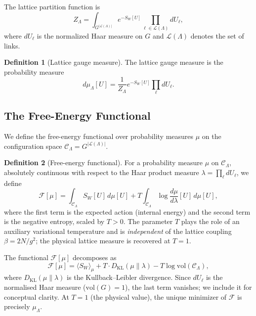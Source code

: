 \documentclass[12pt,a4paper]{article}
\theoremstyle{definition}
\newtheorem{definition}{Definition}[section]
\theoremstyle{plain}
\theoremstyle{remark}
\begin{document}
The lattice partition function is
\begin{equation}
    Z_\Lambda = \int_{G^{|\mathcal{L}(\Lambda)|}} e^{-S_W[U]} \prod_{\ell \in \mathcal{L}(\Lambda)} dU_\ell,
\end{equation}
where $dU_\ell$ is the normalized Haar measure on $G$ and $\mathcal{L}(\Lambda)$ denotes the set of links.

\begin{definition}[Lattice gauge measure]
The lattice gauge measure is the probability measure
\begin{equation}
    d\mu_\Lambda[U] = \frac{1}{Z_\Lambda} e^{-S_W[U]} \prod_{\ell} dU_\ell.
\end{equation}
\end{definition}

\subsection{The Free-Energy Functional}

We define the free-energy functional over probability measures $\mu$ on the configuration space $\mathcal{C}_\Lambda = G^{|\mathcal{L}(\Lambda)|}$.

\begin{definition}[Free-energy functional]
\label{def:free-energy}
For a probability measure $\mu$ on $\mathcal{C}_\Lambda$, absolutely continuous with respect to the Haar product measure $\lambda = \prod_\ell dU_\ell$, we define
\begin{equation}\label{eq:free-energy}
    \mathcal{F}[\mu] = \int_{\mathcal{C}_\Lambda} S_W[U]\, d\mu[U] + T \int_{\mathcal{C}_\Lambda} \log \frac{d\mu}{d\lambda}[U]\, d\mu[U],
\end{equation}
where the first term is the expected action (internal energy) and the second term is the negative entropy, scaled by $T > 0$. The parameter $T$ plays the role of an auxiliary variational temperature and is \emph{independent} of the lattice coupling $\beta = 2N/g^2$; the physical lattice measure is recovered at $T = 1$.
\end{definition}

The functional $\mathcal{F}[\mu]$ decomposes as
\begin{equation}
    \mathcal{F}[\mu] = \langle S_W \rangle_\mu + T \cdot D_{\mathrm{KL}}(\mu \| \lambda) - T \log \mathrm{vol}(\mathcal{C}_\Lambda),
\end{equation}
where $D_{\mathrm{KL}}(\mu \| \lambda)$ is the Kullback--Leibler divergence. Since $dU_\ell$ is the normalised Haar measure ($\mathrm{vol}(G) = 1$), the last term vanishes; we include it for conceptual clarity. At $T = 1$ (the physical value), the unique minimizer of $\mathcal{F}$ is precisely $\mu_\Lambda$.
\end{document}
